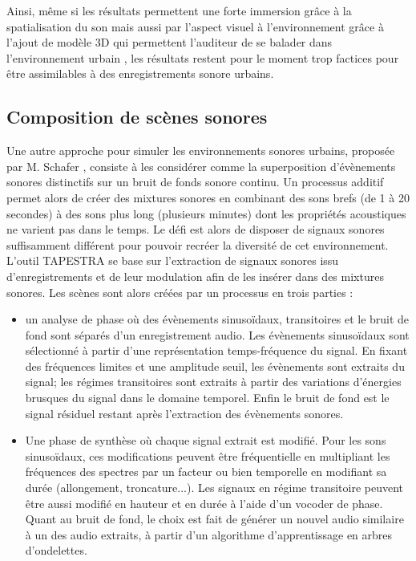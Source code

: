 Ainsi, même si les résultats permettent une forte immersion grâce à la spatialisation du son mais aussi par l'aspect visuel à l'environnement  grâce à l'ajout de modèle 3D qui permettent l'auditeur de se \og balader \fg{} dans l'environnement urbain \cite{stienen2015auralization}, les résultats restent pour le moment trop factices pour être assimilables à des enregistrements sonore urbains.

\subsection{Composition de scènes sonores}

Une autre approche pour simuler les environnements sonores urbains, proposée par M. Schafer \cite{schafer1993soundscape}, consiste à les considérer comme la superposition d'évènements sonores distinctifs sur un bruit de fonds sonore continu. Un processus additif permet alors de créer des mixtures sonores en combinant des sons brefs (de 1 à 20 secondes) à des sons plus long (plusieurs minutes) dont les propriétés acoustiques ne varient pas dans le temps. Le défi est alors de disposer de signaux sonores suffisamment différent pour pouvoir recréer la diversité de cet environnement. L'outil TAPESTRA \cite{misra_musical_2007} se base sur l'extraction de signaux sonores issu d'enregistrements et de leur modulation afin de les insérer dans des mixtures sonores. Les scènes sont alors créées par un processus en trois parties : 

\begin{itemize}
\item un analyse de phase où des évènements sinusoïdaux, transitoires et le bruit de fond sont séparés d'un enregistrement audio. Les évènements sinusoïdaux sont sélectionné à partir d'une représentation temps-fréquence du signal. En fixant des fréquences limites et une amplitude seuil, les évènements sont extraits du signal; les régimes transitoires sont extraits à partir des variations d'énergies brusques du signal dans le domaine temporel. Enfin le bruit de fond est le signal résiduel restant après l'extraction des évènements sonores.
\item Une phase de synthèse où chaque signal extrait est modifié. Pour les sons sinusoïdaux, ces modifications peuvent être fréquentielle en multipliant les fréquences des spectres par un facteur ou bien temporelle en modifiant sa durée (allongement, troncature...). Les signaux en régime transitoire peuvent être aussi modifié en hauteur et en durée à l'aide d'un vocoder de phase. Quant au bruit de fond, le choix est fait de générer un nouvel audio similaire à un des audio extraits, à partir d'un algorithme d'apprentissage en arbres d'ondelettes. 
\end{itemize}  

